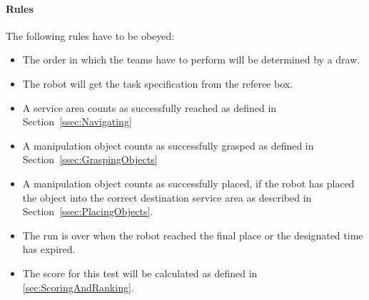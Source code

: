\paragraph{Rules}
The following rules have to be obeyed:

\begin{itemize}
\item The order in which the teams have to perform will be determined by a draw.
\item The robot will get the task specification from the referee box.
\item A service area counts as successfully reached as defined in Section~\ref{ssec:Navigating}
\item A manipulation object counts as successfully grasped as defined in Section~\ref{ssec:GraspingObjects}
\item A manipulation object counts as successfully placed, if the robot has placed the object into the correct destination service area as described in Section~\ref{ssec:PlacingObjects}.
\item  The run is over when the robot reached the final place or the designated time has expired.
\item The score for this test will be calculated as defined in \ref{sec:ScoringAndRanking}.
\end{itemize}


